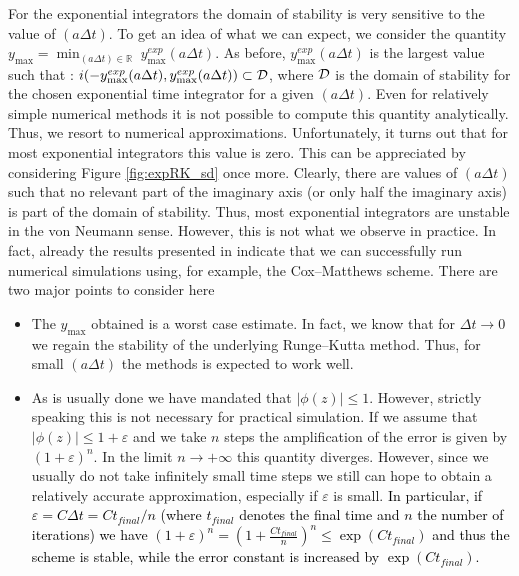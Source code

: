 For the exponential integrators the domain of stability is very sensitive to the value of $(a\Delta t)$. To get an idea of what we can expect, we consider the quantity $y_{\max}=\min_{(a\Delta t)\in\mathbb{R}} \; y^{exp}_{\max}(a \Delta t)$. As before, $y^{exp}_{\max}(a\Delta t)$ is the largest value such that : $i(-y^{exp}_{\max}(a\Delta t), y^{exp}_{\max}(a\Delta t))\subset {\cal D}$, where ${\cal D}$ is the domain of stability for the chosen exponential time integrator for a given $(a\Delta t)$. 
Even for relatively simple numerical methods it is not possible to compute this quantity analytically. Thus, we resort to numerical approximations. Unfortunately, it turns out that for most exponential integrators this value is zero. This can be appreciated by considering Figure \ref{fig:expRK_sd} once more. Clearly, there are values of $(a \Delta t)$ such that no relevant part of the imaginary axis (or only half the imaginary axis) is part of the domain of stability.
Thus, most exponential integrators are unstable in the von Neumann sense. However, this is not what we observe in practice. In fact, already the results presented in \cite{Crouseilles:2018} indicate that we can successfully run numerical simulations using, for example, the Cox--Matthews scheme. There are two major points to consider here
\begin{itemize}
    \item The $y_{\max}$ obtained is a worst case estimate. In fact, we know that for $\Delta t \to 0$ we regain the stability of the underlying Runge--Kutta method. Thus, for small $(a \Delta t)$ the methods is expected to work well.
    \item As is usually done we have mandated that $\vert \phi(z) \vert \leq 1$. However, strictly speaking this is not necessary for practical simulation. If we assume that $\vert \phi(z) \vert \leq 1+\varepsilon$ and we take $n$ steps the amplification of the error is given by $(1+\varepsilon)^n$. In the limit $n \to +\infty$ this quantity diverges. However, since we usually do not take infinitely small time steps we still can hope to obtain a relatively accurate approximation, especially if $\varepsilon$ is small. \textcolor{black}{In particular, if $\varepsilon = C \Delta t = C t_{final}/n$ (where $t_{final}$ denotes the final time and $n$ the number of iterations) we have $(1+\varepsilon)^n = (1+\tfrac{C t_{final}}{n} )^n \leq \exp(C t_{final})$ and thus the scheme is stable, while the error constant is increased by $\exp(C t_{final})$.}
\end{itemize}


